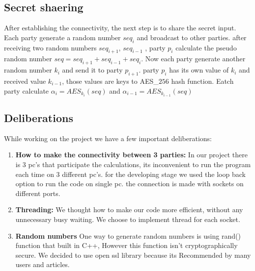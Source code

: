 \documentclass[12pt]{article}
\begin{document}
\subsection{Secret shaering}
After establishing the connectivity, the next step is to share the secret input. Each party generate a random number $seq_i$ and broadcast to other parties. after receiving two random numbers $seq_{i+1}$, $seq_{i-1}$ , party $p_i$ calculate the pseudo random number $seq = seq_{i+1}+seq_{i-1}+seq_{i}$. Now each party generate another random number $k_i$ and send it to party $p_{i+1}$.
party $p_i$ has its own value of $k_i$ and received value $k_{i-1}$, those values are keys to AES\_$256$ hash function. Eatch party calculate $\alpha_i = AES_{k_i}(seq)$ and $\alpha_{i-1} = AES_{k_{i-1}}(seq)$

\subsection{Deliberations}
While working on the project we have a few important deliberations:

\begin{enumerate}
	\item \textbf{How to make the connectivity between 3 parties:}\hfill\break
	In our project there is 3 pc's that participate the calculations, its inconvenient to run the program each time on 3 different pc's. for the developing stage we used the loop back option to run the code on single pc. the connection is made with sockets on different ports.
	
	\item \textbf{Threading:} We thought how to make our code more efficient, without any unnecessary busy waiting. We choose to implement thread for each socket.
	\item \textbf{Random numbers} One way to generate random numbers is using rand() function that built in C++, However this function isn't cryptographically secure. We decided to use open ssl library because its Recommended by many users and articles.
	
\end{enumerate}
\end{document}
